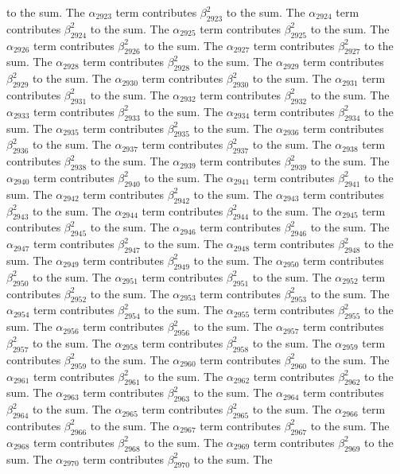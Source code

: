 \begin{lemma}
to the sum. The $\alpha_{2923}$ term contributes $\beta_{2923}^{2}$ to the sum. The $\alpha_{2924}$ term contributes $\beta_{2924}^{2}$ to the sum. The $\alpha_{2925}$ term contributes $\beta_{2925}^{2}$ to the sum. The $\alpha_{2926}$ term contributes $\beta_{2926}^{2}$ to the sum. The $\alpha_{2927}$ term contributes $\beta_{2927}^{2}$ to the sum. The $\alpha_{2928}$ term contributes $\beta_{2928}^{2}$ to the sum. The $\alpha_{2929}$ term contributes $\beta_{2929}^{2}$ to the sum. The $\alpha_{2930}$ term contributes $\beta_{2930}^{2}$ to the sum. The $\alpha_{2931}$ term contributes $\beta_{2931}^{2}$ to the sum. The $\alpha_{2932}$ term contributes $\beta_{2932}^{2}$ to the sum. The $\alpha_{2933}$ term contributes $\beta_{2933}^{2}$ to the sum. The $\alpha_{2934}$ term contributes $\beta_{2934}^{2}$ to the sum. The $\alpha_{2935}$ term contributes $\beta_{2935}^{2}$ to the sum. The $\alpha_{2936}$ term contributes $\beta_{2936}^{2}$ to the sum. The $\alpha_{2937}$ term contributes $\beta_{2937}^{2}$ to the sum. The $\alpha_{2938}$ term contributes $\beta_{2938}^{2}$ to the sum. The $\alpha_{2939}$ term contributes $\beta_{2939}^{2}$ to the sum. The $\alpha_{2940}$ term contributes $\beta_{2940}^{2}$ to the sum. The $\alpha_{2941}$ term contributes $\beta_{2941}^{2}$ to the sum. The $\alpha_{2942}$ term contributes $\beta_{2942}^{2}$ to the sum. The $\alpha_{2943}$ term contributes $\beta_{2943}^{2}$ to the sum. The $\alpha_{2944}$ term contributes $\beta_{2944}^{2}$ to the sum. The $\alpha_{2945}$ term contributes $\beta_{2945}^{2}$ to the sum. The $\alpha_{2946}$ term contributes $\beta_{2946}^{2}$ to the sum. The $\alpha_{2947}$ term contributes $\beta_{2947}^{2}$ to the sum. The $\alpha_{2948}$ term contributes $\beta_{2948}^{2}$ to the sum. The $\alpha_{2949}$ term contributes $\beta_{2949}^{2}$ to the sum. The $\alpha_{2950}$ term contributes $\beta_{2950}^{2}$ to the sum. The $\alpha_{2951}$ term contributes $\beta_{2951}^{2}$ to the sum. The $\alpha_{2952}$ term contributes $\beta_{2952}^{2}$ to the sum. The $\alpha_{2953}$ term contributes $\beta_{2953}^{2}$ to the sum. The $\alpha_{2954}$ term contributes $\beta_{2954}^{2}$ to the sum. The $\alpha_{2955}$ term contributes $\beta_{2955}^{2}$ to the sum. The $\alpha_{2956}$ term contributes $\beta_{2956}^{2}$ to the sum. The $\alpha_{2957}$ term contributes $\beta_{2957}^{2}$ to the sum. The $\alpha_{2958}$ term contributes $\beta_{2958}^{2}$ to the sum. The $\alpha_{2959}$ term contributes $\beta_{2959}^{2}$ to the sum. The $\alpha_{2960}$ term contributes $\beta_{2960}^{2}$ to the sum. The $\alpha_{2961}$ term contributes $\beta_{2961}^{2}$ to the sum. The $\alpha_{2962}$ term contributes $\beta_{2962}^{2}$ to the sum. The $\alpha_{2963}$ term contributes $\beta_{2963}^{2}$ to the sum. The $\alpha_{2964}$ term contributes $\beta_{2964}^{2}$ to the sum. The $\alpha_{2965}$ term contributes $\beta_{2965}^{2}$ to the sum. The $\alpha_{2966}$ term contributes $\beta_{2966}^{2}$ to the sum. The $\alpha_{2967}$ term contributes $\beta_{2967}^{2}$ to the sum. The $\alpha_{2968}$ term contributes $\beta_{2968}^{2}$ to the sum. The $\alpha_{2969}$ term contributes $\beta_{2969}^{2}$ to the sum. The $\alpha_{2970}$ term contributes $\beta_{2970}^{2}$ to the sum. The 
\end{lemma}
